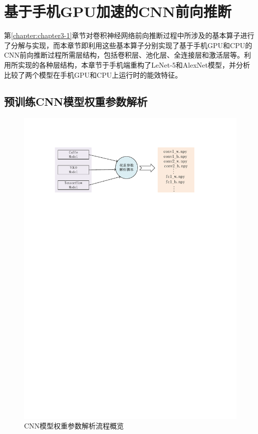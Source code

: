 \section{基于手机GPU加速的CNN前向推断}

第\ref{chapter:chapter3-1}章节对卷积神经网络前向推断过程中所涉及的基本算子进行了分解与实现，而本章节即利用这些基本算子分别实现了基于手机GPU和CPU的CNN前向推断过程所需层结构，包括卷积层、池化层、全连接层和激活层等。利用所实现的各种层结构，本章节于手机端重构了LeNet-5和AlexNet模型，并分析比较了两个模型在手机GPU和CPU上运行时的能效特征。

\subsection{预训练CNN模型权重参数解析}
\label{chapter:chapter321}

\begin{figure}[htbp]
    \begin{center}
    \includegraphics{figures/weight.pdf}
    \end{center}
    \caption{CNN模型权重参数解析流程概览}\label{figure:figure14}
\end{figure}

